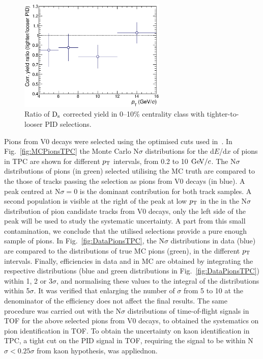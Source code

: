 \begin{figure}[!h]
 \centering
 \includegraphics[angle=0, width=7cm]{./FigCap5/PIDsyst_010.eps}
 \caption{Ratio of ${\rm D_s}$ corrected yield in 0--10\% centrality class with tighter-to-looser PID selections.}
 \label{fig:DsPID010} 
\end{figure}
Pions from V0 decays were selected using the optimised cuts
used in~\cite{Schuchmann:2102194}. In Fig.~\ref{fig:MCPionsTPC} the Monte Carlo 
N$\sigma$ distributions for the d$E$/d$x$ of pions in TPC are shown for 
different $p_{\rm T}$ intervals, from 0.2 to 10 $\mathrm{GeV}/c$.
The N$\sigma$ distributions of pions (in green) selected utilising the MC truth are compared to the
those of tracks passing the selection as pions from V0 decays 
(in blue). A peak centred at N$\sigma=0$ is the dominant contribution for both
track samples.
A second population is visible at the right of the peak at low $p_{\rm T}$ in the in the N$\sigma$ distribution
of pion candidate tracks from V0 decays, 
only the left side of the peak will be used to study the systematic uncertainty.
A part from this small contamination, we conclude that the utilised selections provide a pure
enough sample of pions. 
In Fig.~\ref{fig:DataPionsTPC}, the N$\sigma$ distributions in data (blue) are compared
to the distributions of true MC pions (green), in the different $p_{\rm T}$ intervals.  
Finally, efficiencies in data and in MC are obtained by integrating the respective 
distributions (blue and green distributions in Fig.~\ref{fig:DataPionsTPC})
within 1, 2 or 3$\sigma$, and normalising these values to the integral 
of the distributions within 5$\sigma$. It was verified that enlarging the number of $\sigma$ from 5 to 10 at the 
denominator of the efficiency does not affect the final results.
The same procedure
was carried out with the N$\sigma$ distributions of time-of-flight signals in TOF
for the above selected pions from V0 decays, to obtained the systematics on pion identification in TOF.
To obtain the uncertainty on kaon identification in TPC, a tight cut on the PID 
signal in TOF, requiring the signal to be within N$\sigma < 0.25\sigma$ from kaon hypothesis, was appliednon. 
